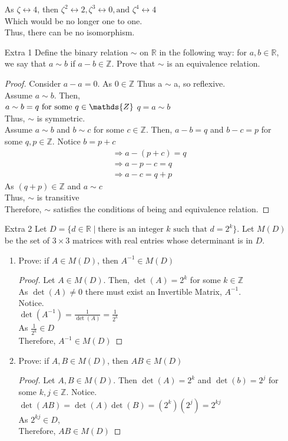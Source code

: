 \documentclass[12pt]{article}
\newcommand{\Z}{\mathds{Z}}
\begin{document}
\begin{enumerate}
		As $\zeta \leftrightarrow 4$, then $\zeta^2 \leftrightarrow 2, \zeta^3 \leftrightarrow 0, \text{and } \zeta^4 \leftrightarrow 4$ \\
		Which would be no longer one to one. \\
		Thus, there can be no isomorphism.
	\item[Extra 1] Define the binary relation $\sim$ on $\mathbb{R}$ in the following way: for $a,b \in \mathbb{R}$, we say that $a \sim b$ if $a-b \in \mathbb{Z}$. Prove that $\sim$ is an equivalence relation.
		\begin{proof}
				Consider $a-a=0$. As $0 \in \Z$ Thus a $\sim$ a, so reflexive.\\
			Assume $a \sim b$. Then, \\
			$a \sim b = q \text{ for some } q \in \Z\\$
			$ q = a \sim b$ \\
			Thus, $\sim$ is symmetric.\\
			Assume $a\sim b$ and $b \sim c$ for some $c \in \Z$. Then, $a-b=q$ and $b-c=p$ for some $q,p\in \Z$. Notice $b=p+c$\\
			$$\begin{aligned}
			&\Rightarrow a-(p+c)=q \\
			&\Rightarrow a-p-c=q \\
			&\Rightarrow a-c=q+p
			\end{aligned}$$
			As $(q+p) \in \Z$ and $a\sim c$ \\
			Thus, $\sim$ is transitive \\
			Therefore, $\sim$ satisfies the conditions of being and equivalence relation.
		\end{proof}
	\item[Extra 2] Let $D=\{d \in \mathbb{R} \mid \text{there is an integer } k \text{ such that } d=2^k\}$. Let $M(D)$ be the set of $3 \times 3$ matrices with real entries whose determinant is in $D$.
	\begin{enumerate}
		\item Prove: if $A \in M(D)$, then $A^{-1} \in M(D)$
			\begin{proof}
				Let $A\in M(D)$. Then, $\det(A)=2^k$ for some $k\in \Z$\\
				As $\det(A) \ne 0$ there must exist an Invertible Matrix, $A^{-1}$.\\
				Notice.\\
				$\det(A^{-1})=\frac{1}{\det(A)}=\frac{1}{2^k}$\\
				As $\frac{1}{2^k} \in D$\\
				Therefore, $A^{-1}\in M(D)$
			\end{proof}
		\item Prove: if $A, B \in M(D)$, then $AB \in M(D)$\\
			\begin{proof}
				Let $A,B\in M(D)$. Then $\det(A)=2^k$ and $\det(b)=2^j$ for some $k,j\in \Z$. Notice.\\
				$\det(AB)=\det(A)\det(B)=(2^k)(2^j)=2^{kj}$\\
				As $2^{kj} \in D$, \\
				Therefore, $AB\in M(D)$
			\end{proof}
	\end{enumerate}
	

\end{enumerate}
\end{document}
